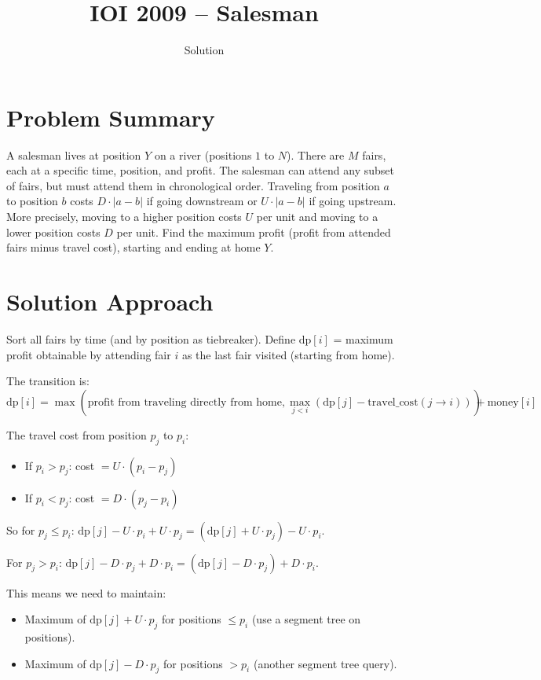 \documentclass[11pt,a4paper]{article}
\title{IOI 2009 -- Salesman}
\author{Solution}
\date{}
\begin{document}
\maketitle

\section{Problem Summary}
A salesman lives at position $Y$ on a river (positions $1$ to $N$). There are $M$ fairs, each at a specific time, position, and profit. The salesman can attend any subset of fairs, but must attend them in chronological order. Traveling from position $a$ to position $b$ costs $D \cdot |a - b|$ if going downstream or $U \cdot |a - b|$ if going upstream. More precisely, moving to a higher position costs $U$ per unit and moving to a lower position costs $D$ per unit. Find the maximum profit (profit from attended fairs minus travel cost), starting and ending at home $Y$.

\section{Solution Approach}
Sort all fairs by time (and by position as tiebreaker). Define $\text{dp}[i]$ = maximum profit obtainable by attending fair $i$ as the last fair visited (starting from home).

The transition is:
\[
\text{dp}[i] = \max\left(\text{profit from traveling directly from home}, \max_{j < i} \left(\text{dp}[j] - \text{travel\_cost}(j \to i)\right)\right) + \text{money}[i]
\]

The travel cost from position $p_j$ to $p_i$:
\begin{itemize}
    \item If $p_i > p_j$: cost $= U \cdot (p_i - p_j)$
    \item If $p_i < p_j$: cost $= D \cdot (p_j - p_i)$
\end{itemize}

So for $p_j \leq p_i$: $\text{dp}[j] - U \cdot p_i + U \cdot p_j = (\text{dp}[j] + U \cdot p_j) - U \cdot p_i$.

For $p_j > p_i$: $\text{dp}[j] - D \cdot p_j + D \cdot p_i = (\text{dp}[j] - D \cdot p_j) + D \cdot p_i$.

This means we need to maintain:
\begin{itemize}
    \item Maximum of $\text{dp}[j] + U \cdot p_j$ for positions $\leq p_i$ (use a segment tree on positions).
    \item Maximum of $\text{dp}[j] - D \cdot p_j$ for positions $> p_i$ (another segment tree query).
\end{itemize}
\end{document}
